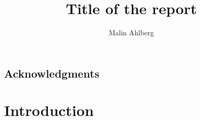 \documentclass{report}
\begin{document}
\title{Title of the report} %
\author{Malin Ahlberg}
\maketitle
\newpage

\tableofcontents
\newpage

\abstract{

}

\newpage

\section*{Acknowledgments}

\newpage
\chapter{Introduction}
\end{document}
